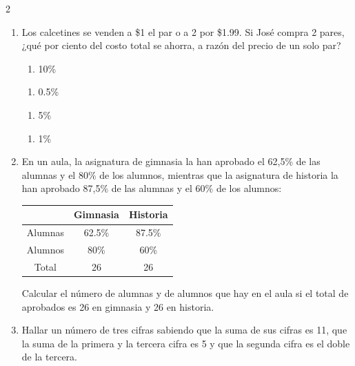 \documentclass[10.5pt,letterpaper]{article}
\begin{document}
\begin{multicols}{2}
\begin{enumerate}
\begin{minipage}{0.23\linewidth}
\begin{enumerate}
\item[d)] 28.26
\end{enumerate}
\end{minipage}
\item Los calcetines se venden a  \$1 el par o a 2 por \$1.99. Si José compra 2 pares, ¿qué por ciento del costo total se ahorra, a razón del precio de un solo par?
\begin{minipage}{0.23\linewidth}
\begin{enumerate}
\item[a)] 10\%
\end{enumerate}
\end{minipage}
\begin{minipage}{0.23\linewidth}
\begin{enumerate}
\item[b)] 0.5\%
\end{enumerate}
\end{minipage}
\begin{minipage}{0.23\linewidth}
\begin{enumerate}
\item[c)] 5\%
\end{enumerate}
\end{minipage}
\begin{minipage}{0.23\linewidth}
\begin{enumerate}
\item[d)] 1\%
\end{enumerate}
\end{minipage}
\item En un aula, la asignatura de gimnasia la han aprobado el 62,5\% de las alumnas y el 80\% de los alumnos, mientras que la asignatura de historia la han aprobado 87,5\% de las alumnas y el 60\% de los alumnos:
\begin{center}
\begin{tabular}{|c|c|c|}
\hline
& Gimnasia & Historia \\ \hline
Alumnas & 62.5\% & 87.5\% \\ \hline
Alumnos & 80\% & 60\% \\ \hline
Total & 26 & 26 \\ \hline
\end{tabular}
\end{center}
Calcular el número de alumnas y de alumnos que hay en el aula si el total de aprobados es 26 en gimnasia y 26 en historia.
\item Hallar un número de tres cifras sabiendo que la suma de sus cifras es 11, que la suma de la primera y la tercera cifra es 5 y que la segunda cifra es el doble de la tercera.

\end{enumerate}
\end{multicols}
\end{document}
